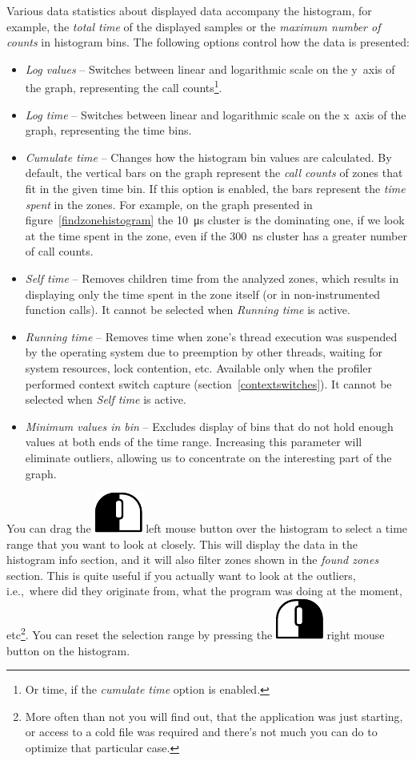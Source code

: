 \documentclass[hidelinks,titlepage,a4paper]{article}
\newcommand{\LMB}{\includegraphics[height=.8\baselineskip]{icons/lmb}}
\newcommand{\RMB}{\includegraphics[height=.8\baselineskip]{icons/rmb}}
\begin{document}
Various data statistics about displayed data accompany the histogram, for example, the \emph{total time} of the displayed samples or the \emph{maximum number of counts} in histogram bins. The following options control how the data is presented:

\begin{itemize}
\item \emph{Log values} -- Switches between linear and logarithmic scale on the y~axis of the graph, representing the call counts\footnote{Or time, if the \emph{cumulate time} option is enabled.}.
\item \emph{Log time} -- Switches between linear and logarithmic scale on the x~axis of the graph, representing the time bins.
\item \emph{Cumulate time} -- Changes how the histogram bin values are calculated. By default, the vertical bars on the graph represent the \emph{call counts} of zones that fit in the given time bin. If this option is enabled, the bars represent the \emph{time spent} in the zones. For example, on the graph presented in figure~\ref{findzonehistogram} the 10~\si{\micro\second} cluster is the dominating one, if we look at the time spent in the zone, even if the 300~\si{\nano\second} cluster has a greater number of call counts.
\item \emph{Self time} -- Removes children time from the analyzed zones, which results in displaying only the time spent in the zone itself (or in non-instrumented function calls). It cannot be selected when \emph{Running time} is active.
\item \emph{Running time} -- Removes time when zone's thread execution was suspended by the operating system due to preemption by other threads, waiting for system resources, lock contention, etc. Available only when the profiler performed context switch capture (section~\ref{contextswitches}). It cannot be selected when \emph{Self time} is active.
\item \emph{Minimum values in bin} -- Excludes display of bins that do not hold enough values at both ends of the time range. Increasing this parameter will eliminate outliers, allowing us to concentrate on the interesting part of the graph.
\end{itemize}

You can drag the \LMB{} left mouse button over the histogram to select a time range that you want to look at closely. This will display the data in the histogram info section, and it will also filter zones shown in the \emph{found zones} section. This is quite useful if you actually want to look at the outliers, i.e.,\ where did they originate from, what the program was doing at the moment, etc\footnote{More often than not you will find out, that the application was just starting, or access to a cold file was required and there's not much you can do to optimize that particular case.}. You can reset the selection range by pressing the \RMB{} right mouse button on the histogram.
\end{document}
